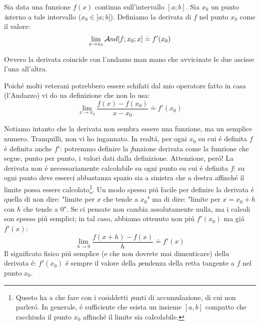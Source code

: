 
\begin{definizione}[Derivata]
Sia data una funzione $f(x)$ continua sull'intervallo $[a;b]$. Sia $x_0$ un punto {\emph interno} a tale intervallo ($x_0 \in ]a;b[$).
Definiamo la derivata di $f$ nel punto $x_0$ come il valore:
 \begin{equation}
  \lim_{x \rightarrow x_0} \mathcal{A}nd[f;x_0;x] \doteq f'(x_0)
 \end{equation}

 Ovvero la derivata coincide con l'andazzo man mano che avvicinate le due ascisse l'una all'altra.

 Poich\'e molti veterani potrebbero essere schifati dal mio operatore fatto in casa (l'Andazzo) vi do ua definizione che non lo usa:
 \begin{equation}
  \lim_{x \rightarrow x_0} \frac{f(x)-f(x_0)}{x-x_0} \doteq f'(x_0)
 \end{equation}
\end{definizione}

 Notiamo intanto che la derivata non sembra essere una funzione, ma un semplice numero. Tranquilli, non vi ho ingannato.
 In realt\'a, per ogni $x_0$ su cui \'e definita $f$ \'e definita anche $f'$: potremmo definire la {\emph funzione} derivata
 come la funzione che segue, punto per punto, i valori dati dalla definizione. Attenzione, per\'o! La derivata non \'e necessariamente
 calcolabile su ogni punto su cui \'e definita $f$: su ogni punto deve esserci abbastanza spazio sia a sinistra che a destra
 affinch\'e il limite possa essere calcolato\footnote{Questo ha a che fare con i cosiddetti {\emph punti di accumulazione}, di
 cui non  parler\'o. In generale, \'e sufficiente che esista un insieme $[a,b]$ compatto che racchiuda il punto $x_0$ affinch\'e
 il limite sia calcolabile.}. Un modo spesso pi\'u facile per definire la derivata \'e quella di non dire: "limite per $x$ che
 tende a $x_0$" ma di dire: "limite per $x=x_0+h$ con $h$ che tende a $0$". Se ci pensate non cambia assolutamente nulla, ma i
 calcoli son spesso pi\'u semplici; in tal caso, abbiamo ottenuto non pi\'u $f'(x_0)$ ma gi\'a $f'(x)$:
 \begin{equation}
  \lim_{h \rightarrow 0} \frac{f(x+h)-f(x)}{h} \doteq f'(x)
 \end{equation}
 Il significato fisico pi\'u semplice (e che non dovrete mai dimenticare) della derivata \'e: $f'(x_0)$ \'e sempre il valore
 della {\emph pendenza } della retta tangente a $f$ nel punto $x_0$.


